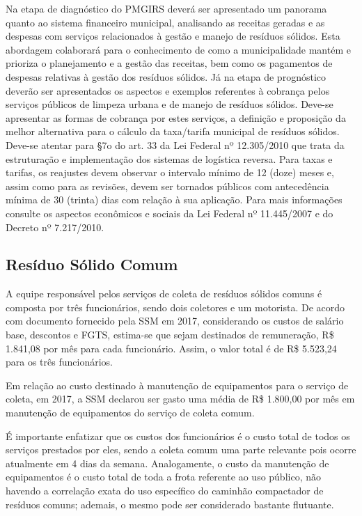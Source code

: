 	Na etapa de diagnóstico do PMGIRS deverá ser apresentado um panorama quanto ao sistema financeiro municipal, analisando as receitas geradas e as despesas com serviços relacionados à gestão e manejo de resíduos sólidos. Esta abordagem colaborará para o conhecimento de como a municipalidade mantém e prioriza o planejamento e a gestão das receitas, bem como os pagamentos de despesas relativas à gestão dos resíduos sólidos.
	Já na etapa de prognóstico deverão ser apresentados os aspectos e exemplos referentes à cobrança pelos serviços públicos de limpeza urbana e de manejo de resíduos sólidos. Deve-se apresentar as formas de cobrança por estes serviços, a definição e proposição da melhor alternativa para o cálculo da taxa/tarifa municipal de resíduos sólidos.
	Deve-se atentar para §7o do art. 33 da Lei Federal nº 12.305/2010 que trata da estruturação e implementação dos sistemas de logística reversa.
	Para taxas e tarifas, os reajustes devem observar o intervalo mínimo de 12 (doze) meses e, assim como para as revisões, devem ser tornados públicos com antecedência mínima de 30 (trinta) dias com relação à sua aplicação.
	Para mais informações consulte os aspectos econômicos e sociais da Lei Federal nº 11.445/2007 e do Decreto nº 7.217/2010.


	\subsection{Resíduo Sólido Comum}
	A equipe responsável pelos serviços de coleta de resíduos sólidos comuns é composta por três funcionários, sendo dois coletores e um motorista. De acordo com documento fornecido pela SSM em 2017, considerando os custos de salário base, descontos e FGTS, estima-se que sejam destinados de remuneração, R\$ 1.841,08 por mês para cada funcionário. Assim, o valor total é de R\$ 5.523,24 para os três funcionários.
	
	Em relação ao custo destinado à manutenção de equipamentos para o serviço de coleta, em 2017, a SSM declarou ser gasto uma média de R\$ 1.800,00 por mês em manutenção de equipamentos do serviço de coleta comum.
	
	É importante enfatizar que os custos dos funcionários é o custo total de todos os serviços prestados por eles, sendo a coleta comum uma parte relevante pois ocorre atualmente em 4 dias da semana. Analogamente, o custo da manutenção de equipamentos é o custo total de toda a frota referente ao uso público, não havendo a correlação exata do uso específico do caminhão compactador de resíduos comuns; ademais, o mesmo pode ser considerado bastante flutuante.
	
